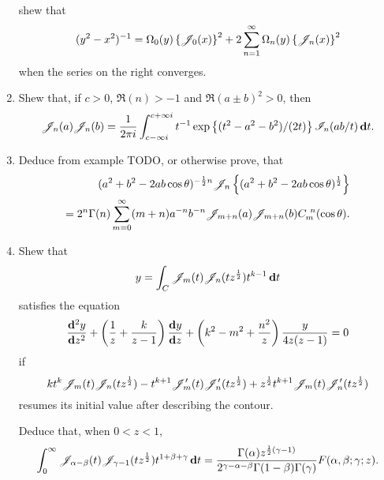 \begin{enumerate}
$$  $$
  shew that
  $$
  (y^{2}-x^{2})^{-1}
  =
  \Omega_{0}(y)
  \left\{ \mathscr{J}_{0}(x) \right\}^{2}
  +
  2 \sum_{n=1}^{\infty} \Omega_{n}(y) \left\{ \mathscr{J}_{n}(x) \right\}^{2}
  $$
  when the series on the right converges.
\item
  Shew that, if $c>0$, $\Re(n) > -1$ and
  $\Re(a \pm b)^{2} > 0$, then
  $$
  \mathscr{J}_{n}(a) \mathscr{J}_{n}(b)
  =
  \frac{1}{2\pi i}
  \int_{c-\infty i}^{c+\infty i}
  t^{-1} \exp \left\{  (t^{2}-a^{2}-b^{2})/(2t) \right\}
  \mathscr{I}_{n}(ab/t) \, \mathbf{d} t.
  $$
\item
  Deduce from example TODO, or otherwise prove, that
  \begin{align*}
    (a^{2}+b^{2}-2ab \cos\theta)^{-\frac{1}{2} n}
    \mathscr{J}_{n}\left\{  (a^{2}+b^{2}-2ab\cos\theta)^{\frac{1}{2}} \right\}
    \\
    =
    2^{n} \Gamma(n)
    \sum_{m=0}^{\infty}
    (m+n) a^{-n} b^{-n} \mathscr{J}_{m+n}(a) \mathscr{J}_{m+n}(b)
    C_{m}^{\ n}(\cos\theta).
  \end{align*}
\item
  Shew that
  $$
  y = \int_{C} \mathscr{J}_{m}(t) \mathscr{J}_{n}(t z^{\frac{1}{2}}) t^{k-1} \, \mathbf{d} t
  $$
  satisfies the equation
  $$
  \frac{\mathbf{d}^{2} y}{\mathbf{d} z^{2}}
  +
  \left( \frac{1}{z} + \frac{k}{z-1} \right) \frac{\mathbf{d} y}{\mathbf{d} z}
  +
  \left( k^{2}-m^{2}+\frac{n^{2}}{z} \right) \frac{y}{4z(z-1)}
  =
  0
  $$
  if
  $$
  k t^{k} \mathscr{J}_{m}(t) \mathscr{J}_{n}(t z^{\frac{1}{2}})
  -
  t^{k+1} \mathscr{J}'_{m}(t) \mathscr{J}'_{n}(t z^{\frac{1}{2}})
  +
  z^{\frac{1}{2}} t^{k+1} \mathscr{J}_{m}(t) \mathscr{J}'_{n}(t z^{\frac{1}{2}})
  $$
  resumes its initial value after describing the contour.

  Deduce that, when $0<z<1$,
  $$
  \int_{0}^{\infty}
  \mathscr{J}_{\alpha-\beta}(t)
  \mathscr{J}_{\gamma-1}(t z^{\frac{1}{2}})
  t^{1+\beta+\gamma}
  \, \mathbf{d} t
  =
  \frac{\Gamma(\alpha) z^{\frac{1}{2}(\gamma-1)}}{ 2^{\gamma-\alpha-\beta}
    \Gamma(1-\beta) \Gamma(\gamma)}
  F(\alpha,\beta;\gamma;z).
  $$
\end{enumerate}